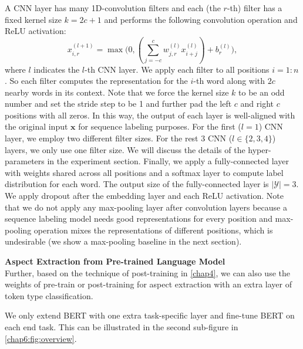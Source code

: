 A CNN layer has many 1D-convolution filters and each (the $r$-th) filter has a fixed kernel size $k=2c+1$ and performs the following convolution operation and ReLU activation: 
\begin{equation}
x_{i,r}^{(l+1)}=\max\bigg(0, (\sum_{j=-c}^c w_{j,r}^{(l)} x_{i+j}^{(l)})+b_r^{(l)}\bigg),
\end{equation}
where $l$ indicates the $l$-th CNN layer. 
We apply each filter to all positions $i=1:n$.
So each filter computes the representation for the $i$-th word along with $2c$ nearby words in its context.  
Note that we force the kernel size $k$ to be an odd number and set the stride step to be 1 and further pad the left $c$ and right $c$ positions with all zeros.  
In this way, the output of each layer is well-aligned with the original input $\mathbf{x}$ for sequence labeling purposes.
For the first ($l=1$) CNN layer, we employ two different filter sizes. 
For the rest 3 CNN ($l \in \{2, 3, 4\}$) layers, we only use one filter size.
We will discuss the details of the hyper-parameters in the experiment section.
Finally, we apply a fully-connected layer with weights shared across all positions and a softmax layer to compute label distribution for each word.
The output size of the fully-connected layer is $|\mathcal{Y}|=3$.
We apply dropout after the embedding layer and each ReLU activation.
Note that we do not apply any max-pooling layer after convolution layers because a sequence labeling model needs good representations for every position and max-pooling operation mixes the representations of different positions, which is undesirable (we show a max-pooling baseline in the next section).


\textbf{Aspect Extraction from Pre-trained Language Model}\\
Further, based on the technique of post-training in \ref{chap4}, we can also use the weights of pre-train or post-training for aspect extraction with an extra layer of token type classification.

We only extend BERT with one extra task-specific layer and fine-tune BERT on each end task.
This can be illustrated in the second sub-figure in \ref{chap6:fig:overview}.


